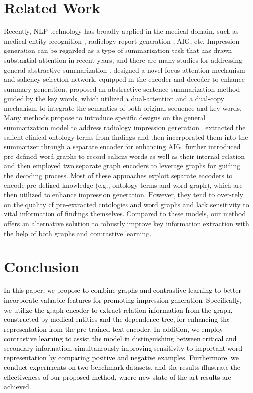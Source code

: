 \documentclass[11pt]{article}
\begin{document}
\section{Related Work}
%
Recently, NLP technology has broadly applied in the medical domain, such as medical entity recognition \cite{liu2021exploring,zhao2019neural}, radiology report generation \cite{chen2021cross,zhang2020radiology,liu2021medical}, AIG, etc.
%
Impression generation can be regarded as a type of summarization task that has drawn substantial attention in recent years, and there are many studies for addressing general abstractive summarization \cite{see2017get,li2020keywords,you2019improving,huang2020knowledge}.
%
 designed a novel focus-attention mechanism and saliency-selection network, equipped in the encoder and decoder to enhance summary generation.
%
 proposed an abstractive sentence summarization method guided by the key words, which utilized a dual-attention and a dual-copy mechanism to integrate the semantics of both original sequence and key words.
%
Many methods propose to introduce specific designs on the general summarization model to address radiology impression generation \cite{zhang2018learning,attend,macavaney2019ontology,hu2021word,abacha2021overview}.
%
 extracted the salient clinical ontology terms from findings and then incorporated them into the summarizer through a separate encoder for enhancing AIG.
%
 further introduced pre-defined word graphs to record salient words as well as their internal relation and then employed two separate graph encoders to leverage graphs for guiding the decoding process.
%
Most of these approaches exploit separate encoders to encode pre-defined knowledge (e.g., ontology terms and word graph), which are then utilized to enhance impression generation.
%
However, they tend to over-rely on the quality of pre-extracted ontologies and word graphs and lack sensitivity to vital information of findings themselves.
%
Compared to these models, our method offers an alternative solution to robustly improve key information extraction with the help of both graphs and contrastive learning.


\section{Conclusion}

\textcolor{black}{
In this paper, we propose to combine graphs and contrastive learning to better incorporate valuable features for promoting impression generation.
%
Specifically, we utilize the graph encoder to extract relation information from the graph, constructed by medical entities and the dependence tree, for enhancing the representation from the pre-trained text encoder.
%
In addition, we employ contrastive learning to assist the model in distinguishing between critical and secondary information, simultaneously improving sensitivity to important word representation by comparing positive and negative examples.
%
Furthermore, we conduct experiments on two benchmark datasets, and the results illustrate the effectiveness of our proposed method, where new state-of-the-art results are achieved.
}
\end{document}
